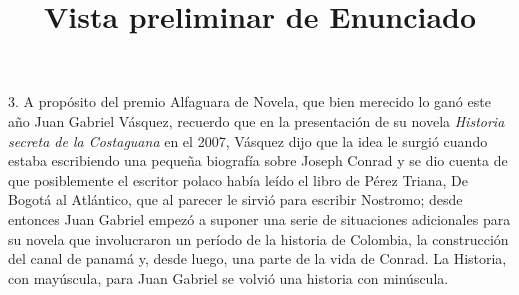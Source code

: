 \documentclass[a4paper,12pt]{article}\usepackage[spanish]{babel}\usepackage{times}
\title{Vista preliminar de Enunciado}
\begin{document}
\twocolumn 

\maketitle

3. A propósito del premio Alfaguara de Novela, que bien merecido lo ganó este año Juan Gabriel Vásquez, recuerdo que en la presentación de su novela  \textit{ Historia secreta de la Costaguana } en el 2007, Vásquez dijo que la idea le surgió cuando estaba escribiendo una pequeña biografía sobre Joseph Conrad y se dio cuenta de que posiblemente el escritor polaco había leído el libro de Pérez Triana, De Bogotá al Atlántico, que al parecer le sirvió para escribir Nostromo; desde entonces Juan Gabriel empezó a suponer una serie de situaciones adicionales para su novela que involucraron un período de la historia de Colombia, la construcción del canal de panamá y, desde luego, una parte de la vida de Conrad. La Historia, con mayúscula, para Juan Gabriel se volvió una historia con minúscula.
\end{document}
